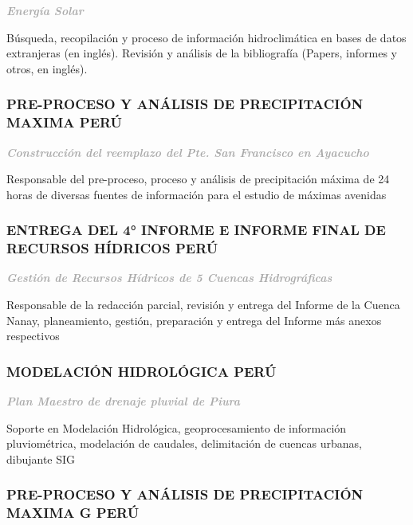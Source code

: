 \documentclass[
  10,
]{article}
\begin{document}
\textcolor{darkgray}{\textbf{\emph{Energía Solar}}}

Búsqueda, recopilación y proceso de información hidroclimática en bases
de datos extranjeras (en inglés). Revisión y análisis de la bibliografía
(Papers, informes y otros, en inglés).

\hypertarget{pre-proceso-y-anuxe1lisis-de-precipitaciuxf3n-maxima-peruxfa}{%
\subsubsection{PRE-PROCESO Y ANÁLISIS DE PRECIPITACIÓN MAXIMA \textbar{}
PERÚ}\label{pre-proceso-y-anuxe1lisis-de-precipitaciuxf3n-maxima-peruxfa}}

\textcolor{darkgray}{\textbf{\emph{Construcción del reemplazo del Pte. San Francisco en Ayacucho}}}

Responsable del pre-proceso, proceso y análisis de precipitación máxima
de 24 horas de diversas fuentes de información para el estudio de
máximas avenidas

\hypertarget{entrega-del-4-informe-e-informe-final-de-recursos-huxeddricos-peruxfa}{%
\subsubsection{ENTREGA DEL 4° INFORME E INFORME FINAL DE RECURSOS
HÍDRICOS \textbar{}
PERÚ}\label{entrega-del-4-informe-e-informe-final-de-recursos-huxeddricos-peruxfa}}

\textcolor{darkgray}{\textbf{\emph{Gestión de Recursos Hídricos de 5 Cuencas Hidrográficas}}}

Responsable de la redacción parcial, revisión y entrega del Informe de
la Cuenca Nanay, planeamiento, gestión, preparación y entrega del
Informe más anexos respectivos

\hypertarget{modelaciuxf3n-hidroluxf3gica-peruxfa}{%
\subsubsection{MODELACIÓN HIDROLÓGICA \textbar{}
PERÚ}\label{modelaciuxf3n-hidroluxf3gica-peruxfa}}

\textcolor{darkgray}{\textbf{\emph{Plan Maestro de drenaje pluvial de Piura}}}

Soporte en Modelación Hidrológica, geoprocesamiento de información
pluviométrica, modelación de caudales, delimitación de cuencas urbanas,
dibujante SIG

\hypertarget{pre-proceso-y-anuxe1lisis-de-precipitaciuxf3n-maxima-g-peruxfa}{%
\subsubsection{PRE-PROCESO Y ANÁLISIS DE PRECIPITACIÓN MAXIMA \textbar{}
G \textbar{}
PERÚ}\label{pre-proceso-y-anuxe1lisis-de-precipitaciuxf3n-maxima-g-peruxfa}}
\end{document}
